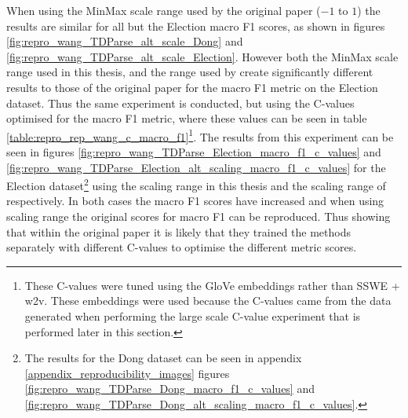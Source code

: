  When using the MinMax scale range used by the original paper \citep{wang-etal-2017-tdparse} ($-1$ to $1$) the results are similar for all but the Election macro F1 scores, as shown in figures \ref{fig:repro_wang_TDParse_alt_scale_Dong} and \ref{fig:repro_wang_TDParse_alt_scale_Election}. However both the MinMax scale range used in this thesis, and the range used by \citet{wang-etal-2017-tdparse} create significantly different results to those of the original paper for the macro F1 metric on the Election dataset. Thus the same experiment is conducted, but using the C-values optimised for the macro F1 metric, where these values can be seen in table \ref{table:repro_rep_wang_c_macro_f1}\footnote{These C-values were tuned using the GloVe embeddings rather than SSWE + w2v. These embeddings were used because the C-values came from the data generated when performing the large scale C-value experiment that is performed later in this section.}. The results from this experiment can be seen in figures \ref{fig:repro_wang_TDParse_Election_macro_f1_c_values} and \ref{fig:repro_wang_TDParse_Election_alt_scaling_macro_f1_c_values} for the Election dataset\footnote{The results for the Dong dataset can be seen in appendix \ref{appendix_reproducibility_images} figures \ref{fig:repro_wang_TDParse_Dong_macro_f1_c_values} and \ref{fig:repro_wang_TDParse_Dong_alt_scaling_macro_f1_c_values}.} using the scaling range in this thesis and the scaling range of \citet{wang-etal-2017-tdparse} respectively. In both cases the macro F1 scores have increased and when using \citet{wang-etal-2017-tdparse} scaling range the original scores for macro F1 can be reproduced. Thus showing that within the original paper it is likely that they trained the methods separately with different C-values to optimise the different metric scores.  
 
